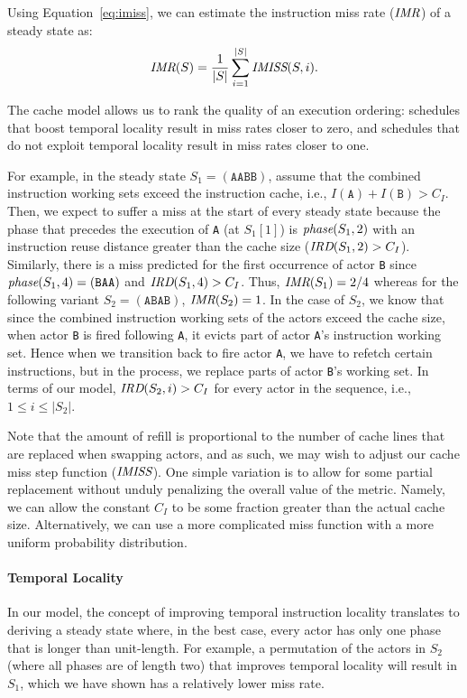 Using 
Equation~\ref{eq:imiss}, we can estimate the instruction miss
rate ($\mbox{\it IMR}$) of a steady state as: 
\begin{equation}
\label{eq:imr}
  \mbox{\it IMR}(S) = \frac{1}{|S|}\sum_{i=1}^{|S|} \mbox{\it IMISS}(S,i).
\end{equation}

The cache model allows us to rank the quality of an
execution ordering: schedules that boost temporal locality
result in miss rates closer to zero, and schedules that do not
exploit temporal locality result in miss rates closer to one.

For example, in the steady 
state $S_1=(\texttt{AABB})$, assume that the combined instruction working
sets exceed the instruction cache, i.e., $I(\texttt{A}) + I(\texttt{B}) > C_I$.
Then, we expect to suffer a miss at the start of every
steady state because the phase that precedes the execution of
\texttt{A} (at $S_1[1]$) is $\mbox{\it phase}(S_1,2)$ with 
an instruction reuse distance greater than the cache size 
($\mbox{\it IRD}(S_1,2) > C_I$). Similarly, there is a 
miss predicted for the first occurrence of actor \texttt{B} since
$\mbox{\it phase}(S_1,4)=(\texttt{BAA})$ and 
$\mbox{\it IRD}(S_1, 4)>C_I$. Thus, $\mbox{\it IMR}(S_1)=2/4$ whereas for the
following variant $S_2=(\texttt{ABAB})$, $\mbox{\it IMR}(S_2)=1$.
In the case of $S_2$, we know that since the combined
instruction working sets of the actors exceed the cache size, when
actor \texttt{B} is fired following \texttt{A}, it evicts part of
actor \texttt{A}'s instruction working set. Hence when we transition
back to fire actor \texttt{A}, we have to refetch certain
instructions, but in the process, we replace parts of actor
\texttt{B}'s working set. In terms of our model, $\mbox{\it IRD}(S_2,i)>C_I$
for every actor in the sequence, i.e., $1\le i\le|S_2|$.

Note that the
amount of refill is proportional to the number of cache lines that are
replaced when swapping actors, and as such, we may wish to adjust
our cache miss step function ($\mbox{\it IMISS}$). One simple variation is to allow for
some partial replacement without unduly penalizing the overall value
of the metric. Namely, we can allow the constant $C_I$ to be some
fraction greater than the actual cache size. Alternatively, we can use
a more complicated miss function with a more uniform probability
distribution.

\paragraph*{Temporal Locality} In our model, the concept of improving
temporal instruction locality translates to deriving a steady state where, in the
best case, every actor has only one phase that is longer than unit-length.
For example, a permutation of the actors in $S_2$ (where all
phases are of length two) that improves temporal locality
will result in $S_1$, which we have shown has a relatively lower miss rate.


